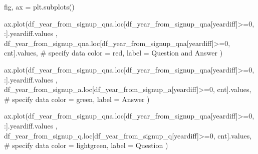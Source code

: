 \documentclass[
  letterpaper,
  DIV=11,
  numbers=noendperiod]{scrartcl}
\newenvironment{Shaded}{\begin{snugshade}}{\end{snugshade}}
\newcommand{\CommentTok}[1]{\textcolor[rgb]{0.37,0.37,0.37}{#1}}
\newcommand{\DecValTok}[1]{\textcolor[rgb]{0.68,0.00,0.00}{#1}}
\newcommand{\NormalTok}[1]{\textcolor[rgb]{0.00,0.23,0.31}{#1}}
\newcommand{\OperatorTok}[1]{\textcolor[rgb]{0.37,0.37,0.37}{#1}}
\newcommand{\StringTok}[1]{\textcolor[rgb]{0.13,0.47,0.30}{#1}}
\begin{document}
\begin{Shaded}
\begin{Highlighting}[]
\NormalTok{fig, ax }\OperatorTok{=}\NormalTok{ plt.subplots()}


\NormalTok{ax.plot(df\_year\_from\_signup\_qna.loc[df\_year\_from\_signup\_qna[}\StringTok{\textquotesingle{}yeardiff\textquotesingle{}}\NormalTok{]}\OperatorTok{\textgreater{}=}\DecValTok{0}\NormalTok{, :].yeardiff.values ,}
\NormalTok{        df\_year\_from\_signup\_qna.loc[df\_year\_from\_signup\_qna[}\StringTok{\textquotesingle{}yeardiff\textquotesingle{}}\NormalTok{]}\OperatorTok{\textgreater{}=}\DecValTok{0}\NormalTok{, }\StringTok{\textquotesingle{}cnt\textquotesingle{}}\NormalTok{].values, }\CommentTok{\# specify data}
\NormalTok{        color }\OperatorTok{=} \StringTok{\textquotesingle{}red\textquotesingle{}}\NormalTok{,}
\NormalTok{        label }\OperatorTok{=} \StringTok{\textquotesingle{}Question and Answer\textquotesingle{}}
\NormalTok{) }


\NormalTok{ax.plot(df\_year\_from\_signup\_qna.loc[df\_year\_from\_signup\_qna[}\StringTok{\textquotesingle{}yeardiff\textquotesingle{}}\NormalTok{]}\OperatorTok{\textgreater{}=}\DecValTok{0}\NormalTok{, :].yeardiff.values ,}
\NormalTok{        df\_year\_from\_signup\_a.loc[df\_year\_from\_signup\_a[}\StringTok{\textquotesingle{}yeardiff\textquotesingle{}}\NormalTok{]}\OperatorTok{\textgreater{}=}\DecValTok{0}\NormalTok{, }\StringTok{\textquotesingle{}cnt\textquotesingle{}}\NormalTok{].values, }\CommentTok{\# specify data}
\NormalTok{        color }\OperatorTok{=} \StringTok{\textquotesingle{}green\textquotesingle{}}\NormalTok{,}
\NormalTok{        label }\OperatorTok{=} \StringTok{\textquotesingle{}Answer\textquotesingle{}}
\NormalTok{) }

\NormalTok{ax.plot(df\_year\_from\_signup\_qna.loc[df\_year\_from\_signup\_qna[}\StringTok{\textquotesingle{}yeardiff\textquotesingle{}}\NormalTok{]}\OperatorTok{\textgreater{}=}\DecValTok{0}\NormalTok{, :].yeardiff.values ,}
\NormalTok{        df\_year\_from\_signup\_q.loc[df\_year\_from\_signup\_q[}\StringTok{\textquotesingle{}yeardiff\textquotesingle{}}\NormalTok{]}\OperatorTok{\textgreater{}=}\DecValTok{0}\NormalTok{, }\StringTok{\textquotesingle{}cnt\textquotesingle{}}\NormalTok{].values, }\CommentTok{\# specify data}
\NormalTok{        color }\OperatorTok{=} \StringTok{\textquotesingle{}lightgreen\textquotesingle{}}\NormalTok{,}
\NormalTok{        label }\OperatorTok{=} \StringTok{\textquotesingle{}Question\textquotesingle{}}
\NormalTok{) }


\end{Highlighting}
\end{Shaded}
\end{document}
